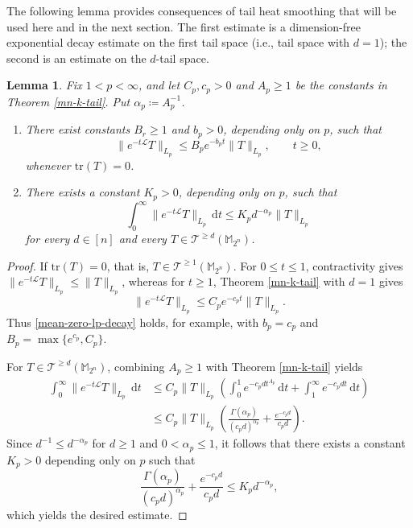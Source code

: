 \documentclass{amsbook}
\newtheorem{lemma}[theorem]{Lemma}
\theoremstyle{definition}
\theoremstyle{remark}
\numberwithin{section}{chapter}
\numberwithin{equation}{chapter}
\newcommand{\M}{\mathbb{M}}
\newcommand{\1}{\mathbf{1}}
\newcommand{\tr}{\mathrm{tr}}
\begin{document}
The following lemma provides consequences of tail heat smoothing that will be used here and in the next section. The first estimate is a dimension-free exponential decay estimate on the first tail space (i.e., tail space with $d=1$); the second is an estimate on the $d$-tail space.

\begin{lemma}\label{etl-pp-theta}
Fix $1<p<\infty$, and let $C_{p},c_{p}>0$ and $A_{p}\geq1$ be the constants in Theorem \ref{mn-k-tail}.  Put $\alpha_p\coloneqq A_{p}^{-1}$.
\begin{enumerate}[{\rm (i)}]
\item There exist constants $B_{r}\geq1$ and $b_{p}>0$, depending only on $p$, such that
\begin{equation}\label{mean-zero-lp-decay}
\|e^{-t\mathcal{L}}T\|_{L_p}
 \leq B_p e^{-b_pt}\|T\|_{L_p},
\qquad t\geq0,
\end{equation}
whenever $\tr(T)=0$.

\item There exists a constant $K_p>0$, depending only on $p$, such that
\begin{equation}\label{integrated-tail-decay}
\int_0^\infty\|e^{-t\mathcal{L}}T\|_{L_p}\,\mathrm{d}t \leq K_p d^{-\alpha_p}\|T\|_{L_p}
\end{equation}
for every $d\in[n]$ and every
$T\in\mathcal{T}^{\geq d}(\mathbb{M}_{2^n})$.
\end{enumerate}
\end{lemma}

\begin{proof}
If $\tr(T)=0$, that is, $T\in\mathcal{T}^{\geq 1}(\M_{2^{n}})$.  For $0\leq t\leq1$,
contractivity gives $\|e^{-t\mathcal{L}}T\|_{L_p}\leq\|T\|_{L_p}$,
whereas for $t\geq1$, Theorem \ref{mn-k-tail} with $d=1$ gives
\[
\|e^{-t\mathcal{L}}T\|_{L_p}
 \leq C_p e^{-c_pt}\|T\|_{L_p}.
\]
Thus \eqref{mean-zero-lp-decay} holds, for example, with
$b_p=c_p$ and $B_p=\max\{e^{c_p},C_p\}$.

For $T\in\mathcal{T}^{\geq d}(\M_{2^{n}})$, combining $A_p\geq1$ with Theorem
\ref{mn-k-tail} yields
\begin{align*}
\int_0^\infty\|e^{-t\mathcal{L}}T\|_{L_p}\,\mathrm{d}t&\leq C_p\|T\|_{L_p}\left(\int_0^1 e^{-c_pdt^{A_p}}\,\mathrm{d}t+\int_1^\infty e^{-c_pdt}\,\mathrm{d}t\right)\\
&\leq C_p\|T\|_{L_p}\left(\frac{\Gamma(\alpha_p)}{(c_pd)^{\alpha_p}}+\frac{e^{-c_pd}}{c_pd}\right).
\end{align*}
Since $d^{-1}\leq d^{-\alpha_{p}}$ for $d\geq 1$ and $0<\alpha_{p}\leq 1$, it follows that there exists a constant $K_{p}>0$ depending only on $p$ such that
\[
\frac{\Gamma(\alpha_p)}{(c_pd)^{\alpha_p}}+\frac{e^{-c_pd}}{c_pd}\leq K_{p}d^{-\alpha_{p}},
\]
which yields the desired estimate.
\end{proof}
\end{document}
